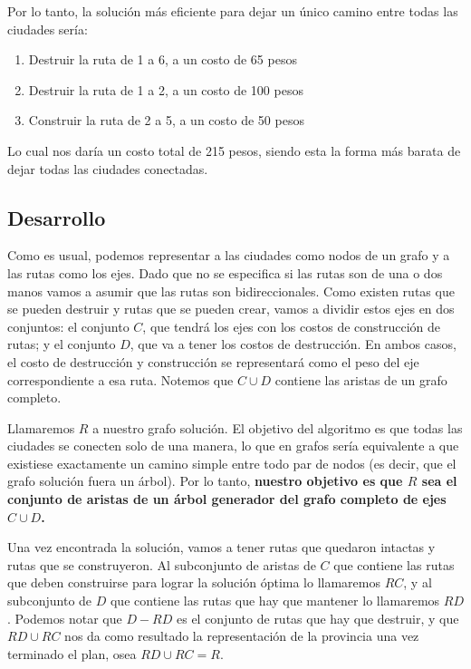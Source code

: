\bigskip

Por lo tanto, la solución más eficiente para dejar un único camino entre todas las ciudades sería:

\begin{enumerate}
	\item Destruir la ruta de 1 a 6, a un costo de 65 pesos

	\item Destruir la ruta de 1 a 2, a un costo de 100 pesos

	\item Construir la ruta de 2 a 5, a un costo de 50 pesos
\end{enumerate}

Lo cual nos daría un costo total de 215 pesos, siendo esta la forma más barata de dejar todas las ciudades conectadas.

\subsection{Desarrollo}
Como es usual, podemos representar a las ciudades como nodos de un grafo y a las rutas como los ejes. Dado que no se especifica si las rutas son de una o dos manos vamos a asumir que las rutas son bidireccionales. Como existen rutas que se pueden destruir y rutas que se pueden crear, vamos a dividir estos ejes en dos conjuntos: el conjunto $C$, que tendrá los ejes con los costos de construcción de rutas; y el conjunto $D$, que va a tener los costos de destrucción. En ambos casos, el costo de destrucción y construcción se representará como el peso del eje correspondiente a esa ruta. Notemos que $C \cup D$ contiene las aristas de un grafo completo. %

Llamaremos $R$ a nuestro grafo solución. El objetivo del algoritmo es que todas las ciudades se conecten solo de una manera, lo que en grafos sería equivalente a que existiese exactamente un camino simple entre todo par de
nodos (es decir, que el grafo solución fuera un árbol). Por lo tanto, \textbf{nuestro objetivo es que $R$ sea el conjunto de aristas de un árbol generador del grafo completo de ejes $C \cup D$.} %

Una vez encontrada la solución, vamos a tener rutas que quedaron intactas y rutas que se construyeron. Al subconjunto de aristas de $C$ que contiene las rutas que deben construirse para lograr la solución óptima lo llamaremos $RC$, y al subconjunto de $D$ que contiene las rutas que hay que mantener lo llamaremos $RD$. Podemos notar que $D - RD$ es el conjunto de rutas que hay que destruir, y que $RD \cup RC$ nos da como resultado la representación de la provincia una vez terminado el plan, osea $RD \cup RC = R$.

